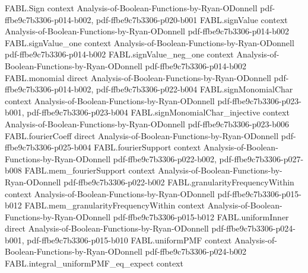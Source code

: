 \begin{theorem}
\label{FABL.pmfExpectation_biasedStandardizedSign}
\leanok
{}
\proofstep
  {FABL.Sign}
  {context}
  {Analysis-of-Boolean-Functions-by-Ryan-ODonnell}
  {pdf-ffbe9c7b3306-p014-b002,
    pdf-ffbe9c7b3306-p020-b001}
\proofstep
  {FABL.signValue}
  {context}
  {Analysis-of-Boolean-Functions-by-Ryan-ODonnell}
  {pdf-ffbe9c7b3306-p014-b002}
\proofstep
  {FABL.signValue_one}
  {context}
  {Analysis-of-Boolean-Functions-by-Ryan-ODonnell}
  {pdf-ffbe9c7b3306-p014-b002}
\proofstep
  {FABL.signValue_neg_one}
  {context}
  {Analysis-of-Boolean-Functions-by-Ryan-ODonnell}
  {pdf-ffbe9c7b3306-p014-b002}
\proofstep
  {FABL.monomial}
  {direct}
  {Analysis-of-Boolean-Functions-by-Ryan-ODonnell}
  {pdf-ffbe9c7b3306-p014-b002,
    pdf-ffbe9c7b3306-p022-b004}
\proofstep
  {FABL.signMonomialChar}
  {context}
  {Analysis-of-Boolean-Functions-by-Ryan-ODonnell}
  {pdf-ffbe9c7b3306-p023-b001,
    pdf-ffbe9c7b3306-p023-b004}
\proofstep
  {FABL.signMonomialChar_injective}
  {context}
  {Analysis-of-Boolean-Functions-by-Ryan-ODonnell}
  {pdf-ffbe9c7b3306-p023-b006}
\proofstep
  {FABL.fourierCoeff}
  {direct}
  {Analysis-of-Boolean-Functions-by-Ryan-ODonnell}
  {pdf-ffbe9c7b3306-p025-b004}
\proofstep
  {FABL.fourierSupport}
  {context}
  {Analysis-of-Boolean-Functions-by-Ryan-ODonnell}
  {pdf-ffbe9c7b3306-p022-b002,
    pdf-ffbe9c7b3306-p027-b008}
\proofstep
  {FABL.mem_fourierSupport}
  {context}
  {Analysis-of-Boolean-Functions-by-Ryan-ODonnell}
  {pdf-ffbe9c7b3306-p022-b002}
\proofstep
  {FABL.granularityFrequencyWithin}
  {context}
  {Analysis-of-Boolean-Functions-by-Ryan-ODonnell}
  {pdf-ffbe9c7b3306-p015-b012}
\proofstep
  {FABL.mem_granularityFrequencyWithin}
  {context}
  {Analysis-of-Boolean-Functions-by-Ryan-ODonnell}
  {pdf-ffbe9c7b3306-p015-b012}
\proofstep
  {FABL.uniformInner}
  {direct}
  {Analysis-of-Boolean-Functions-by-Ryan-ODonnell}
  {pdf-ffbe9c7b3306-p024-b001,
    pdf-ffbe9c7b3306-p015-b010}
\proofstep
  {FABL.uniformPMF}
  {context}
  {Analysis-of-Boolean-Functions-by-Ryan-ODonnell}
  {pdf-ffbe9c7b3306-p024-b002}
\proofstep
  {FABL.integral_uniformPMF_eq_expect}
  {context}

\end{theorem}
